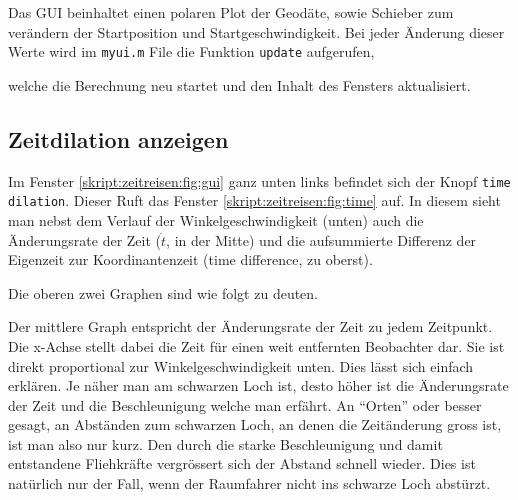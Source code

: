 \begin{refsection}
    Das GUI beinhaltet einen polaren Plot der Geodäte, sowie Schieber zum verändern der Startposition und Startgeschwindigkeit. Bei jeder Änderung dieser Werte wird im \texttt{myui.m} File die Funktion \texttt{update} aufgerufen, 
      
    welche die Berechnung neu startet und den Inhalt des Fensters aktualisiert.
    
    \subsection{Zeitdilation anzeigen}
    Im Fenster \ref{skript:zeitreisen:fig:gui} ganz unten links befindet sich der Knopf \texttt{time dilation}. Dieser Ruft das Fenster \ref{skript:zeitreisen:fig:time} auf. In diesem sieht man nebst dem Verlauf der Winkelgeschwindigkeit (unten) auch die Änderungsrate der Zeit ($\dot{t}$, in der Mitte) und die aufsummierte Differenz der Eigenzeit zur Koordinantenzeit (time difference, zu oberst).
    
    Die oberen zwei Graphen sind wie folgt zu deuten. 
    
    Der mittlere Graph entspricht der Änderungsrate der Zeit zu jedem Zeitpunkt. Die x-Achse stellt dabei die Zeit für einen weit entfernten Beobachter dar. Sie ist direkt proportional zur Winkelgeschwindigkeit unten. Dies lässt sich einfach erklären. Je näher man am schwarzen Loch ist, desto höher ist die Änderungsrate der Zeit und die Beschleunigung welche man erfährt. An ``Orten'' oder besser gesagt, an Abständen zum schwarzen Loch, an denen die Zeitänderung gross ist, ist man also nur kurz. Den durch die starke Beschleunigung und damit entstandene Fliehkräfte vergrössert sich der Abstand schnell wieder.
    Dies ist natürlich nur der Fall, wenn der Raumfahrer nicht ins schwarze Loch abstürzt.
    

\end{refsection}
